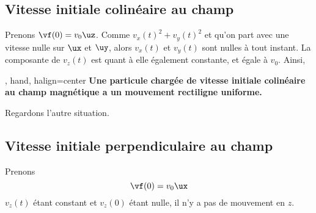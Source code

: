 \documentclass[../main/main.tex]{subfiles}
\begin{document}
\subsection{Vitesse initiale colinéaire au champ}
Prenons $\vf(0) = v_0\uz$. Comme $v_x(t)^2 + v_y(t)^2$ et qu'on part avec une
vitesse nulle sur $\ux$ et $\uy$, alors $v_x(t)$ et $v_y(t)$ sont nulles à tout
instant. La composante de $v_z(t)$ est quant à elle également constante, et
égale à $v_0$. Ainsi,
\begin{tror}{, hand, halign=center}
    \bfseries
    Une particule chargée de vitesse initiale colinéaire au champ magnétique a
    un mouvement rectiligne uniforme.
\end{tror}

Regardons l'autre situation.
\subsection{Vitesse initiale perpendiculaire au champ}
Prenons
\[\vf(0) = v_0\ux\]
$v_z(t)$ étant constant et $v_z(0)$ étant nulle, il n'y a pas de mouvement en
$z$.
\end{document}
